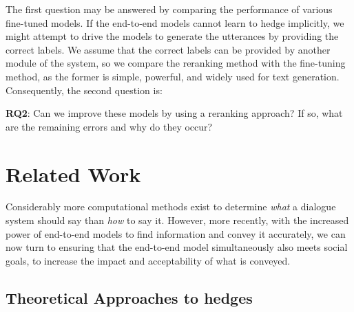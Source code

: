 \documentclass[11pt]{article}
\begin{document}
The first question may be answered by comparing the performance of various fine-tuned models. If the end-to-end models cannot learn to hedge implicitly, we might attempt to drive the models to generate the utterances by providing the correct labels. We assume that the correct labels can be provided by another module of the system, so we compare the reranking method  with the fine-tuning method, as the former is simple, powerful, and widely used for text generation. Consequently, the second question is:

\textbf{RQ2}: Can we improve these models by using a reranking approach? If so, what are the remaining errors and why do they occur? \label{rq2}



\section{Related Work}\label{related_work}

Considerably more computational methods exist to determine \textit{what} a dialogue system should say than \textit{how} to say it. However, more recently, with the increased power of end-to-end models to find information and convey it accurately, we can now turn to ensuring that the end-to-end model simultaneously also meets social goals, to increase the impact and acceptability of what is conveyed. 


\subsection{Theoretical Approaches to hedges}\label{theory_hedges}
\end{document}
